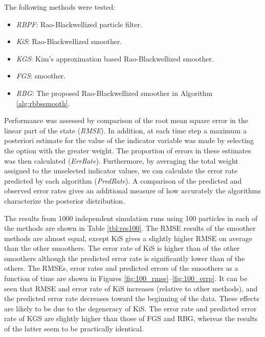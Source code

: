 \documentclass[twocolumn]{autart}    %
\begin{document}
The following methods were tested:
%
\begin{itemize}
\item {\em RBPF}: Rao-Blackwellized particle filter.
\item {\em KiS}: Rao-Blackwellized \cite{Kitagawa:1996} smoother.
\item {\em KGS}: Kim's approximation based Rao-Blackwellized
  \cite{Godsill+Doucet+West:2004} smoother.
\item {\em FGS}: \cite{Fong+Godsill+Doucet+West:2002} smoother.
\item {\em RBG}: The proposed Rao-Blackwellized
  \cite{Godsill+Doucet+West:2004} smoother in Algorithm
  \ref{alg:rbbssmooth}.
\end{itemize}
%
Performance was assessed by comparison of the root mean square error
in the linear part of the state ({\em RMSE}). In addition, at each
time step a maximum a posteriori estimate for the value of the
indicator variable was made by selecting the option with the greater
weight. The proportion of errors in these estimates was then
calculated ({\em ErrRate}). Furthermore, by averaging the total weight
assigned to the unselected indicator values, we can calculate the
error rate predicted by each algorithm ({\em PredRate}). A comparison
of the predicted and observed error rates gives an additional measure
of how accurately the algorithms characterize the posterior
distribution.

The results from 1000 independent simulation runs using 100 particles
in each of the methods are shown in Table \ref{tbl:res100}. The RMSE
results of the smoother methods are almost equal, except KiS gives a slightly
higher RMSE on average than the other smoothers. The error rate of KiS
is higher than of the other smoothers although the predicted error
rate is significantly lower than of the others. The RMSEs, error rates
and predicted errors of the smoothers as a function of time are shown in
Figures \ref{fig:100_rmse}--\ref{fig:100_errp}. It can be seen that
RMSE and error rate of KiS increases (relative to other methods), and
the predicted error rate decreases toward the beginning of the data.
These effects are likely to be due to the degeneracy of KiS. The error
rate and predicted error rate of KGS are slightly higher than those of FGS
and RBG, whereas the results of the latter seem to be practically
identical.
\end{document}
